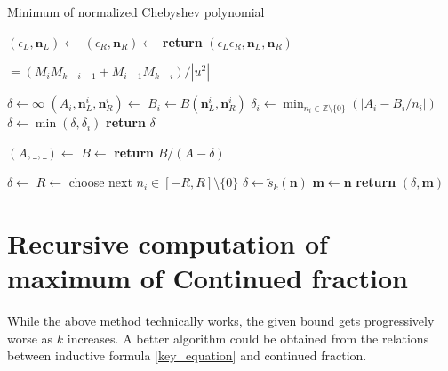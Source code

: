 \documentclass{article}
\theoremstyle{definition}
\theoremstyle{plain}
\theoremstyle{remark}
\numberwithin{equation}{section}
\newcommand{\bZ}{\mathbb{Z}}
\newcommand{\abs}[1]{\left\lvert{#1}\right\rvert}
\begin{document}
\begin{algorithm}
  \caption{Minimum of normalized Chebyshev polynomial}
  \begin{algorithmic}
      \State $(\epsilon_L, \mathbf{n}_L) \gets$ 
      \State $(\epsilon_R, \mathbf{n}_R) \gets$ 
      \State \textbf{return} $(\epsilon_L \epsilon_R, \mathbf{n}_L, \mathbf{n}_R)$
    \EndFunction

     $= (M_i M_{k-i-1} + M_{i-1} M_{k-i}) / \abs{u^2}$
    \EndFunction

      \State $\delta \gets \infty$
        \State $(A_i, \mathbf{n}^i_L, \mathbf{n}^i_R) \gets$ 
        \State $B_i \gets B(\mathbf{n}^i_L, \mathbf{n}^i_R)$
        \State $\delta_i \gets \min_{n_i \in \bZ \setminus \{0\}} (\abs{A_i - B_i / n_i})$
        \State $\delta \gets \min(\delta, \delta_i)$
      \EndFor
      \State \textbf{return} $\delta$
    \EndFunction

      \State $(A, \_, \_) \gets$ 
      \State $B \gets$ 
      \State \textbf{return} {$B / (A - \delta)$}
    \EndFunction

      \State $\delta \gets$ 
          \State $R \gets$ 
          \State choose next $n_i \in [- R, R] \setminus \{0\}$
        \EndFor
          \State $\delta \gets \tilde{s}_k(\mathbf{n})$
          \State $\mathbf{m} \gets \mathbf{n}$
        \EndIf
      \EndWhile
      \State \textbf{return} $(\delta, \mathbf{m})$
    \EndFunction
  \end{algorithmic}
\end{algorithm}

\section{Recursive computation of maximum of Continued fraction}

While the above method technically works,
the given bound gets progressively worse as $k$ increases.
A better algorithm could be obtained from the relations between
inductive formula \eqref{key_equation} and continued fraction.
\end{document}
